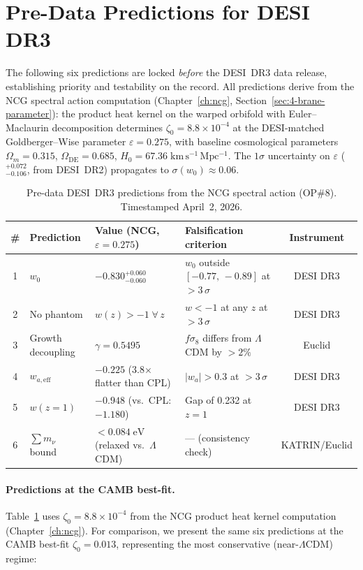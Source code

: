\section{Pre-Data Predictions for DESI DR3}
\label{sec:2-DR3}

The following six predictions are locked \emph{before} the DESI~DR3 data release, establishing priority and testability on the record. All predictions derive from the NCG spectral action computation (Chapter~\ref{ch:ncg}, Section~\ref{sec:4-brane-parameter}): the product heat kernel on the warped orbifold with Euler--Maclaurin decomposition determines $\zeta_0 = 8.8 \times 10^{-4}$ at the DESI-matched Goldberger--Wise parameter $\varepsilon = 0.275$, with baseline cosmological parameters $\Omega_m = 0.315$, $\Omega_\mathrm{DE} = 0.685$, $H_0 = 67.36\;\mathrm{km\,s^{-1}\,Mpc^{-1}}$.  The $1\sigma$ uncertainty on $\varepsilon$ (${}^{+0.072}_{-0.106}$, from DESI~DR2) propagates to $\sigma(w_0) \approx 0.06$.

\begin{table}[htbp]
\centering
\caption{Pre-data DESI~DR3 predictions from the NCG spectral action (OP\#8). Timestamped April~2, 2026.}
\label{tab:2-DR3-predictions}
\small
\begin{tabular}{@{}clllc@{}}
\toprule
\# & Prediction & Value (NCG, $\varepsilon = 0.275$) & Falsification criterion & Instrument \\
\midrule
1 & $w_0$ & $-0.830^{+0.060}_{-0.060}$ & $w_0$ outside $[-0.77,\, -0.89]$ at $>3\,\sigma$ & DESI DR3 \\[3pt]
2 & No phantom & $w(z) > -1\;\forall\, z$ & $w < -1$ at any $z$ at $>3\,\sigma$ & DESI DR3 \\[3pt]
3 & Growth decoupling & $\gamma = 0.5495$ & $f\sigma_8$ differs from $\Lambda$CDM by $>2\%$ & Euclid \\[3pt]
4 & $w_{a,\mathrm{eff}}$ & $-0.225$ (3.8$\times$ flatter than CPL) & $|w_a| > 0.3$ at $>3\,\sigma$ & DESI DR3 \\[3pt]
5 & $w(z{=}1)$ & $-0.948$ (vs.\ CPL: $-1.180$) & Gap of 0.232 at $z = 1$ & DESI DR3 \\[3pt]
6 & $\sum m_\nu$ bound & $< 0.084\;\mathrm{eV}$ (relaxed vs.\ $\Lambda$CDM) & --- (consistency check) & KATRIN/Euclid \\
\bottomrule
\end{tabular}
\end{table}

\paragraph{Predictions at the CAMB best-fit.}
Table~\ref{tab:2-DR3-predictions} uses $\zeta_0 = 8.8 \times 10^{-4}$ from the NCG product heat kernel computation (Chapter~\ref{ch:ncg}).  For comparison, we present the same six predictions at the CAMB best-fit $\zeta_0 = 0.013$, representing the most conservative (near-$\Lambda$CDM) regime:


